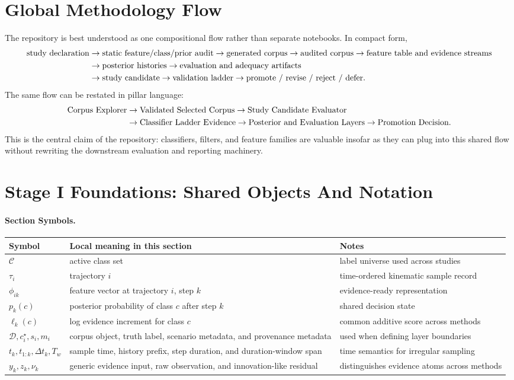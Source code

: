 \documentclass[11pt]{article}
\newcommand{\sectionsymbol}[3]{#1 & #2 & #3 \\}
\newcommand{\sectionsymbols}[1]{%
\begin{center}
\small
\setlength{\tabcolsep}{4pt}
\begin{tabularx}{0.95\textwidth}{>{\raggedright\arraybackslash}p{0.16\textwidth}X>{\raggedright\arraybackslash}p{0.18\textwidth}}
\toprule
Symbol & Local meaning in this section & Notes \\
\midrule
#1
\bottomrule
\end{tabularx}
\end{center}
}
\begin{document}
\section{Global Methodology Flow}
The repository is best understood as one compositional flow rather than separate notebooks. In compact form,
\begin{align}
\text{study declaration}
&\rightarrow
\text{static feature/class/prior audit}
\rightarrow
\text{generated corpus}
\rightarrow
\text{audited corpus}
\rightarrow
\text{feature table and evidence streams}
\notag \\
&\rightarrow
\text{posterior histories}
\rightarrow
\text{evaluation and adequacy artifacts}
\notag \\
&\rightarrow
\text{study candidate}
\rightarrow
\text{validation ladder}
\rightarrow
\text{promote / revise / reject / defer}.
\end{align}
The same flow can be restated in pillar language:
\begin{align}
\text{Corpus Explorer}
&\rightarrow
\text{Validated Selected Corpus}
\rightarrow
\text{Study Candidate Evaluator}
\notag \\
&\rightarrow
\text{Classifier Ladder Evidence}
\rightarrow
\text{Posterior and Evaluation Layers}
\rightarrow
\text{Promotion Decision}.
\end{align}
This is the central claim of the repository: classifiers, filters, and feature families are valuable insofar as they can plug into this shared flow without rewriting the downstream evaluation and reporting machinery.

\section{Stage I Foundations: Shared Objects And Notation}
\paragraph{Section Symbols.}
\sectionsymbols{
\sectionsymbol{\(\mathcal{C}\)}{active class set}{label universe used across studies}
\sectionsymbol{\(\tau_i\)}{trajectory \(i\)}{time-ordered kinematic sample record}
\sectionsymbol{\(\phi_{ik}\)}{feature vector at trajectory \(i\), step \(k\)}{evidence-ready representation}
\sectionsymbol{\(p_k(c)\)}{posterior probability of class \(c\) after step \(k\)}{shared decision state}
\sectionsymbol{\(\ell_k(c)\)}{log evidence increment for class \(c\)}{common additive score across methods}
\sectionsymbol{\(\mathcal{D}, c_i^\star, s_i, m_i\)}{corpus object, truth label, scenario metadata, and provenance metadata}{used when defining layer boundaries}
\sectionsymbol{\(t_k, t_{1:k}, \Delta t_k, T_w\)}{sample time, history prefix, step duration, and duration-window span}{time semantics for irregular sampling}
\sectionsymbol{\(y_k, z_k, \nu_k\)}{generic evidence input, raw observation, and innovation-like residual}{distinguishes evidence atoms across methods}
}
\end{document}
